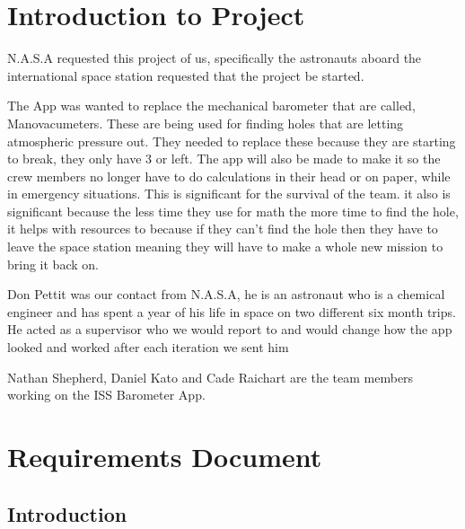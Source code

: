 \documentclass[onecolumn, draftclsnofoot,10pt, compsoc]{IEEEtran}
\begin{document}

\section{Introduction to Project}

N.A.S.A requested this project of us, specifically the astronauts aboard the international space station requested that the project be started. 

The App was wanted to replace the mechanical barometer that are called, Manovacumeters.
These are being used for finding holes that are letting atmospheric pressure out. 
They needed to replace these because they are starting to break, they only have 3 or left. 
The app will also be made to make it so the crew members no longer have to do calculations in their head or on paper, while in emergency situations. 
This is significant for the survival of the team. 
it also is significant because the less time they use for math the more time to find the hole, it helps with resources to because if they can't find the hole then they have to leave the space station meaning they will have to make a whole new mission to bring it back on. 

Don Pettit was our contact from N.A.S.A, he is an astronaut who is a chemical engineer and has spent a year of his life in space on two different six month trips. 
He acted as a supervisor who we would report to and would change how the app looked and worked after each iteration we sent him 

 Nathan Shepherd, Daniel Kato and Cade Raichart are the team members working on the ISS Barometer App. 

\section{Requirements Document}

\subsection{Introduction}
\end{document}

